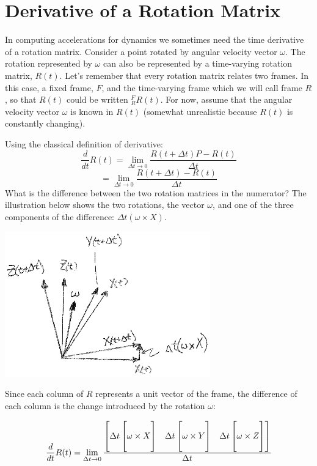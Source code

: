 \newpage

\section{Derivative of a Rotation Matrix}\label{derivativeofrotationmatrix}

In computing accelerations for dynamics we sometimes need the time derivative of a rotation matrix.
Consider a point rotated by angular velocity vector $\omega$.  The rotation represented by $\omega$ can also be represented by a time-varying rotation matrix,
$R(t)$.  Let's remember that every rotation matrix relates two frames.  In this case, a fixed frame, $F$, and the time-varying frame which we will call frame $R$, so that $R(t)$ could be written ${^F_RR(t)}$.    For now, assume that the angular velocity vector $\omega$ is known in $R(t)$ (somewhat unrealistic because $R(t)$ is constantly changing).

Using the classical definition of derivative:
\[
\frac{d}{dt} R(t)  = \lim_{\Delta t \to 0} \frac{R(t+\Delta t)P - R(t)}{\Delta t}
\]
\[
 = \lim_{\Delta t \to 0} \frac{R(t+\Delta t) - R(t)}{\Delta t}
\]
What is the difference between the two rotation matrices in the numerator?  The illustration below shows the two rotations, the vector $\omega$, and one of the three components of the difference: $\Delta t (\omega\times X)$.

\begin{center}
\includegraphics[width=3.5in]{figs_apdx/00917.eps}
\end{center}

Since each column of $R$ represents a unit vector of the frame, the difference of each column is the change introduced by the rotation $\omega$:

\[
 \frac{d}{dt} R(t) = \lim_{\Delta t \to 0} \frac{
     \begin{bmatrix}
         \Delta t\begin{bmatrix}\\ \omega\times X \\ \\ \end{bmatrix} & \Delta t\begin{bmatrix} \\ \omega \times Y \\ \\ \end{bmatrix} &  \Delta t\begin{bmatrix} \\  \omega \times Z \\ \\ \end{bmatrix}
     \end{bmatrix}
   }{\Delta t}
\]

